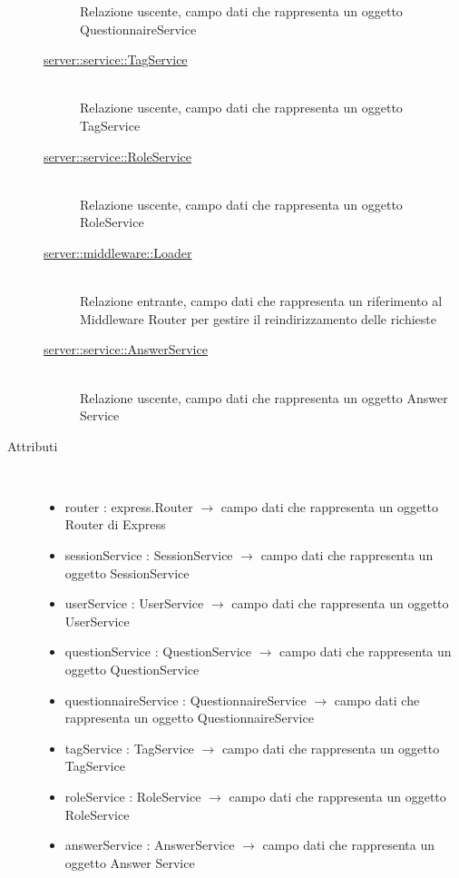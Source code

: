 \begin{description}
\begin{description}
	Relazione uscente, campo dati che rappresenta un oggetto QuestionnaireService
	\item[\hyperlink{server::service::TagService}{server::service::TagService}] \hfill \\
	Relazione uscente, campo dati che rappresenta un oggetto TagService
	\item[\hyperlink{server::service::RoleService}{server::service::RoleService}] \hfill \\
	Relazione uscente, campo dati che rappresenta un oggetto RoleService
	\item[\hyperlink{server::middleware::Loader}{server::middleware::Loader}] \hfill \\
	Relazione entrante, campo dati che rappresenta un riferimento al Middleware Router per gestire il reindirizzamento delle richieste
	\item[\hyperlink{server::service::AnswerService}{server::service::AnswerService}] \hfill \\
	Relazione uscente, campo dati che rappresenta un oggetto Answer Service
\end{description}

\item[Attributi] \hfill \\
\vspace{-7mm}
\begin{itemize}
	\item router : express.Router $\rightarrow$ campo dati che rappresenta un oggetto Router di Express
	\item sessionService : SessionService $\rightarrow$ campo dati che rappresenta un oggetto SessionService
	\item userService : UserService $\rightarrow$ campo dati che rappresenta un oggetto UserService
	\item questionService : QuestionService $\rightarrow$ campo dati che rappresenta un oggetto QuestionService
	\item questionnaireService : QuestionnaireService $\rightarrow$ campo dati che rappresenta un oggetto QuestionnaireService
	\item tagService : TagService $\rightarrow$ campo dati che rappresenta un oggetto TagService
	\item roleService : RoleService $\rightarrow$ campo dati che rappresenta un oggetto RoleService
	\item answerService : AnswerService $\rightarrow$ campo dati che rappresenta un oggetto Answer Service
\end{itemize}


\end{description}
